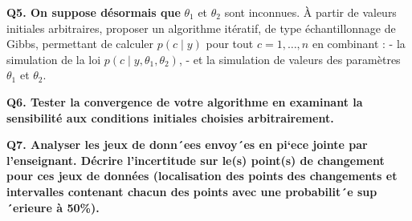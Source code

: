 \documentclass[
]{article}
\begin{document}
\textbf{Q5. On suppose désormais que} \(\theta_1\) et \(\theta_2\) sont
inconnues. À partir de valeurs initiales arbitraires, proposer un
algorithme itératif, de type échantillonnage de Gibbs, permettant de
calculer \(p(c \mid y)\) pour tout \(c = 1, \ldots, n\) en combinant : -
la simulation de la loi \(p(c \mid y, \theta_1, \theta_2)\), - et la
simulation de valeurs des paramètres \(\theta_1\) et \(\theta_2\).

\textbf{Q6. Tester la convergence de votre algorithme en examinant la
sensibilité aux conditions initiales choisies arbitrairement.}

\textbf{Q7. Analyser les jeux de donn´ees envoy´es en pi`ece jointe par
l'enseignant. Décrire l'incertitude sur le(s) point(s) de changement
pour ces jeux de données (localisation des points des changements et
intervalles contenant chacun des points avec une probabilit´e
sup´erieure à 50\%).}
\end{document}
